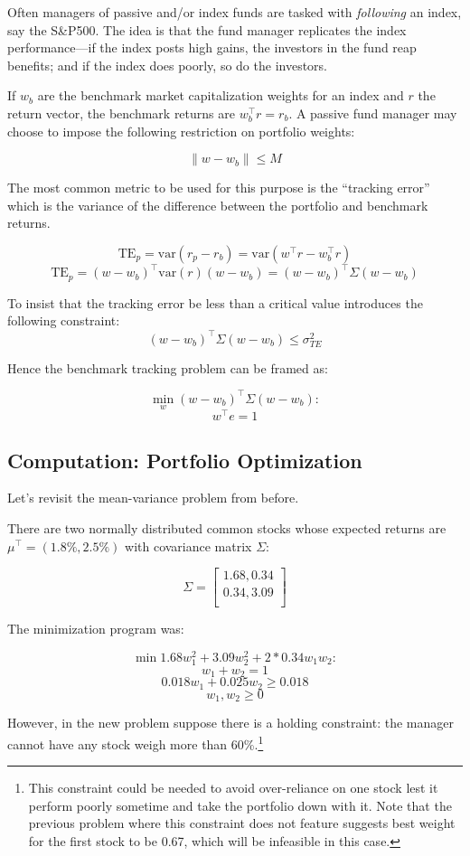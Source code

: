 \documentclass[11pt,]{article}
\let\rmarkdownfootnote\footnote%
\def\footnote{\protect\rmarkdownfootnote}
\begin{document}
Often managers of passive and/or index funds are tasked with
\emph{following} an index, say the S\&P500. The idea is that the fund
manager replicates the index performance---if the index posts high
gains, the investors in the fund reap benefits; and if the index does
poorly, so do the investors.

If \(w_b\) are the benchmark market capitalization weights for an index
and \(r\) the return vector, the benchmark returns are
\(w_b^{\top}r = r_b\). A passive fund manager may choose to impose the
following restriction on portfolio weights:

\[\|w-w_b\|\leq M\]

The most common metric to be used for this purpose is the ``tracking
error'' which is the variance of the difference between the portfolio
and benchmark returns.

\[\text{TE}_p = \text{var}(r_p-r_b)=\text{var}(w^{\top}r-w^{\top}_b r)\]
\[\text{TE}_p = (w-w_b)^{\top}\text{var}(r)(w-w_b)=(w-w_b)^{\top}\Sigma(w-w_b)\]

To insist that the tracking error be less than a critical value
introduces the following constraint:
\[(w-w_b)^{\top}\Sigma(w-w_b)\leq \sigma^2_{TE}\]

Hence the benchmark tracking problem can be framed as:

\[\min_w{} (w-w_b)^{\top}\Sigma(w-w_b):\] \[w^{\top}e = 1 \]

\subsection{Computation: Portfolio
Optimization}\label{computation-portfolio-optimization}

Let's revisit the mean-variance problem from before.

There are two normally distributed common stocks whose expected returns
are \(\mu^{\top} = (1.8\%, 2.5\%)\) with covariance matrix \(\Sigma\):

\[\Sigma = 
\begin{bmatrix}
1.68, 0.34\\
0.34, 3.09\\
\end{bmatrix}
\]

The minimization program was:

\[\min{} 1.68w_1^2+3.09w_2^2+2*0.34w_1w_2:\] \[w_1+w_2=1\]
\[0.018w_1 + 0.025w_2 \geq 0.018\] \[w_1, w_2\geq 0\]

However, in the new problem suppose there is a holding constraint: the
manager cannot have any stock weigh more than 60\%.\footnote{This
  constraint could be needed to avoid over-reliance on one stock lest it
  perform poorly sometime and take the portfolio down with it. Note that
  the previous problem where this constraint does not feature suggests
  best weight for the first stock to be 0.67, which will be infeasible
  in this case.}
\end{document}
